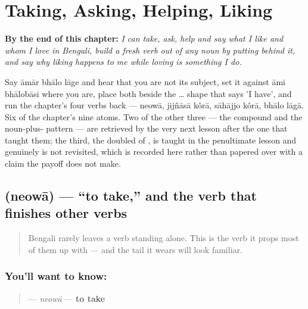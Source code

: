
\chapter{Taking, Asking, Helping, Liking}
\label{ch:bn-conjunct-verbs}

\begin{chapteropening}
\textbf{By the end of this chapter:} \emph{I can take, ask, help and say what I like and whom I love in Bengali, build a fresh verb out of any noun by putting  behind it, and say why liking happens to me while loving is something I do.}

Say āmār bhālo lāge and hear that you are not its subject, set it against āmi bhālobāsi where you are, place both beside the  …  shape that says 'I have', and run the chapter's four verbs back — neowā, jijñāsā kôrā, sāhājjo kôrā, bhālo lāgā. Six of the chapter's nine atoms. Two of the other three — the  compound and the noun-plus- pattern — are retrieved by the very next lesson after the one that taught them; the third, the doubled  of , is taught in the penultimate lesson and genuinely is not revisited, which is recorded here rather than papered over with a claim the payoff does not make.
\end{chapteropening}

\section[\texorpdfstring{\bn{নেওয়া} (neowā)}{নেওয়া (neowā)}]{ (neowā) — \textquotedblleft{}to take,\textquotedblright{} and the verb that finishes other verbs}

\label{lesson:BN-C09-neowa}



\begin{quote}
Bengali rarely leaves a verb standing alone. This is the verb it props most of them up with — and the tail it wears will look familiar.
\end{quote}

\subsection*{You'll want to know: }
\begin{quote}
\textbf{} — \emph{neowā} — \textbf{to take}
\end{quote}

